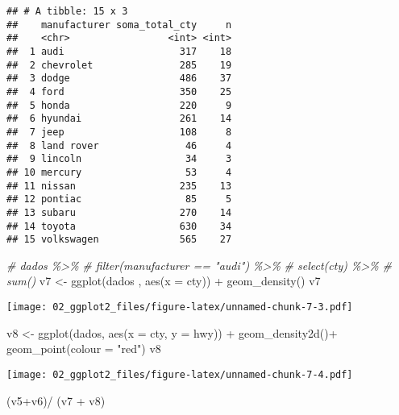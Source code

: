 \documentclass[
]{book}
\newenvironment{Shaded}{\begin{snugshade}}{\end{snugshade}}
\newcommand{\AttributeTok}[1]{\textcolor[rgb]{0.77,0.63,0.00}{#1}}
\newcommand{\CommentTok}[1]{\textcolor[rgb]{0.56,0.35,0.01}{\textit{#1}}}
\newcommand{\FunctionTok}[1]{\textcolor[rgb]{0.00,0.00,0.00}{#1}}
\newcommand{\NormalTok}[1]{#1}
\newcommand{\OtherTok}[1]{\textcolor[rgb]{0.56,0.35,0.01}{#1}}
\newcommand{\SpecialCharTok}[1]{\textcolor[rgb]{0.00,0.00,0.00}{#1}}
\newcommand{\StringTok}[1]{\textcolor[rgb]{0.31,0.60,0.02}{#1}}
\begin{document}
\begin{verbatim}
## # A tibble: 15 x 3
##    manufacturer soma_total_cty     n
##    <chr>                 <int> <int>
##  1 audi                    317    18
##  2 chevrolet               285    19
##  3 dodge                   486    37
##  4 ford                    350    25
##  5 honda                   220     9
##  6 hyundai                 261    14
##  7 jeep                    108     8
##  8 land rover               46     4
##  9 lincoln                  34     3
## 10 mercury                  53     4
## 11 nissan                  235    13
## 12 pontiac                  85     5
## 13 subaru                  270    14
## 14 toyota                  630    34
## 15 volkswagen              565    27
\end{verbatim}

\begin{Shaded}
\begin{Highlighting}[]
\CommentTok{\# dados \%\textgreater{}\% }
\CommentTok{\#   filter(manufacturer == "audi") \%\textgreater{}\% }
\CommentTok{\#   select(cty) \%\textgreater{}\% }
\CommentTok{\#   sum()}
\NormalTok{v7 }\OtherTok{\textless{}{-}} \FunctionTok{ggplot}\NormalTok{(dados , }\FunctionTok{aes}\NormalTok{(}\AttributeTok{x =}\NormalTok{ cty)) }\SpecialCharTok{+} 
  \FunctionTok{geom\_density}\NormalTok{()}
\NormalTok{v7}
\end{Highlighting}
\end{Shaded}

\texttt{[image: 02\_ggplot2\_files/figure-latex/unnamed-chunk-7-3.pdf]}

\begin{Shaded}
\begin{Highlighting}[]
\NormalTok{v8 }\OtherTok{\textless{}{-}} \FunctionTok{ggplot}\NormalTok{(dados, }\FunctionTok{aes}\NormalTok{(}\AttributeTok{x =}\NormalTok{ cty, }\AttributeTok{y =}\NormalTok{ hwy)) }\SpecialCharTok{+} 
  \FunctionTok{geom\_density2d}\NormalTok{()}\SpecialCharTok{+}
  \FunctionTok{geom\_point}\NormalTok{(}\AttributeTok{colour =} \StringTok{"red"}\NormalTok{)}
\NormalTok{v8}
\end{Highlighting}
\end{Shaded}

\texttt{[image: 02\_ggplot2\_files/figure-latex/unnamed-chunk-7-4.pdf]}

\begin{Shaded}
\begin{Highlighting}[]
\NormalTok{(v5}\SpecialCharTok{+}\NormalTok{v6)}\SpecialCharTok{/}\NormalTok{ (v7 }\SpecialCharTok{+}\NormalTok{ v8)}
\end{Highlighting}
\end{Shaded}
\end{document}
